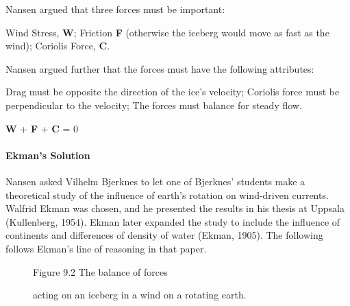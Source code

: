 Nansen argued that three forces must be important:
\begin{enumerate}
\vitem Wind Stress, \textbf{W};
\vitem Friction \textbf{F} (otherwise the iceberg would move as fast as the wind);
\vitem Coriolis Force, \textbf{C}.
\end{enumerate}
Nansen argued further that the forces must have the following attributes:
\begin{enumerate}
\vitem Drag must be opposite the direction of the ice's velocity;
\vitem Coriolis force must be perpendicular to the velocity;
\vitem The forces must balance for steady flow.
\end{enumerate}
\begin{center}
\textbf{W} + \textbf{F} + \textbf{C} = 0
\end{center}

\paragraph{Ekman's Solution}
Nansen asked Vilhelm Bjerknes to let one
of Bjerknes' students make a theoretical study of the influence of
earth's rotation on wind-driven currents. Walfrid Ekman was chosen,
and he presented the results in his thesis at Uppsala (Kullenberg,
1954). Ekman later expanded the study to include the influence of
continents and differences of density of water (Ekman, 1905). The
following follows Ekman's line of reasoning in that paper.

\begin{figure}[t!]
\centering
{}
\footnotesize
Figure 9.2 The balance of forces \rule{0mm}{3ex}acting on an iceberg
in a wind on a rotating earth.

\label{fig:forcesketch}
\vspace{-3ex}
\end{figure}


